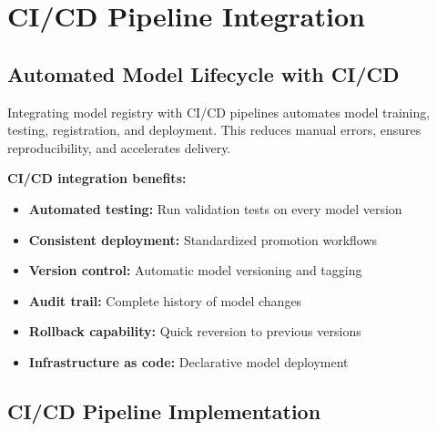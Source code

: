 \section{CI/CD Pipeline Integration}

\subsection{Automated Model Lifecycle with CI/CD}

Integrating model registry with CI/CD pipelines automates model training, testing, registration, and deployment. This reduces manual errors, ensures reproducibility, and accelerates delivery.

\textbf{CI/CD integration benefits:}
\begin{itemize}
    \item \textbf{Automated testing:} Run validation tests on every model version
    \item \textbf{Consistent deployment:} Standardized promotion workflows
    \item \textbf{Version control:} Automatic model versioning and tagging
    \item \textbf{Audit trail:} Complete history of model changes
    \item \textbf{Rollback capability:} Quick reversion to previous versions
    \item \textbf{Infrastructure as code:} Declarative model deployment
\end{itemize}

\subsection{CI/CD Pipeline Implementation}

